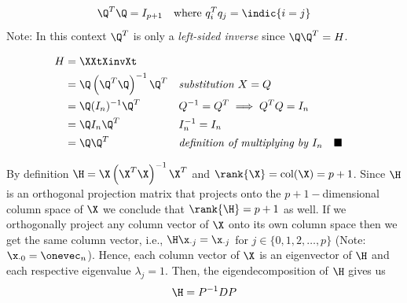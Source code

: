 \documentclass[12pt]{article}
\begin{document}
\begin{enumerate}

\begin{tcolorbox}[colback = white, sharp corners]
\[
\Q^T \Q = I_{p+1} \quad \text{where } q_i^T q_j = \indic{i = j}
\]
Note: In this context $\Q^T$ is only a \emph{left-sided inverse} since $\Q\Q^T = H$.
\end{tcolorbox}


\begin{tcolorbox}[colback = white, sharp corners]

\begin{align*}
H &= \XXtXinvXt \\
&= \Q \left(\Q^T \Q \right)^{-1} \Q^T && \emph{substitution } X = Q \\
&= \Q (I_n)^{-1} \Q^T && Q^{-1} = Q^T \implies Q^TQ = I_n \\
&= \Q I_n \Q^T && I_n^{-1} = I_n \\
&= \Q \Q^T && \emph{definition of multiplying by } I_n  \quad \blacksquare
\end{align*}

\end{tcolorbox}

\newpage

\begin{tcolorbox}[colback = white, sharp corners]
By definition $\H = \X \left( \X^T \X \right)^{-1} \X^T$ and $\rank{\X} = \text{col}(\X) =  p+1$. Since $\H$ is an orthogonal projection matrix that projects onto the $p+1-$dimensional column space of $\X$ we conclude that $\rank{\H} = p+1$ as well. If we orthogonally project any column vector of $\X$ onto its own column space then we get the same column vector, i.e., $\H \x_{\cdot j} = \x_{\cdot j} $ for $j\in \lbrace 0, 1, 2, \ldots, p \rbrace$ (Note: $\x_{\cdot 0} = \onevec_n$). Hence, each column vector of $\X$ is an eigenvector of $\H$ and each respective eigenvalue $\lambda_j =1$. Then, the eigendecomposition of $\H$ gives us
\[
	\H = P^{-1} D P
\]


\end{tcolorbox}
\end{enumerate}
\end{document}
